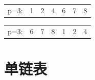 \documentclass[lang=cn,newtx,10pt,scheme=chinese]{../../elegantbook}
\begin{document}
\begin{table}[!htbp]
\centering
\begin{tabular}{c|c|c|c|c|c|c|}
\cline{2-7}
p=3: & 1 & 2 & 4 & 6 & 7 & 8 \\
\cline{2-7}
\end{tabular}
\end{table}

\begin{table}[!htbp]
\centering
\begin{tabular}{c|c|c|c|c|c|c|}
\cline{2-7}
p=3: & 6 & 7 & 8 & 1 & 2 & 4 \\
\cline{2-7}
\end{tabular}
\end{table}

\chapter{单链表}
\end{document}
